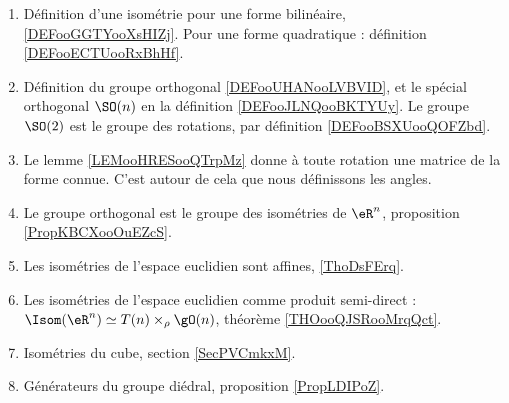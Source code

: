 
      \label{THMooVUCLooCrdbxm}
\begin{enumerate}
    \item 
        Définition d'une isométrie pour une forme bilinéaire, \ref{DEFooGGTYooXsHIZj}. Pour une forme quadratique : définition \ref{DEFooECTUooRxBhHf}.
    \item
        Définition du groupe orthogonal \ref{DEFooUHANooLVBVID}, et le spécial orthogonal \( \SO(n)\) en la définition \ref{DEFooJLNQooBKTYUy}. Le groupe \( \SO(2)\) est le groupe des rotations, par définition \ref{DEFooBSXUooQOFZbd}.
    \item
        Le lemme \ref{LEMooHRESooQTrpMz} donne à toute rotation une matrice de la forme connue. C'est autour de cela que nous définissons les angles.
    \item
        Le groupe orthogonal est le groupe des isométries de \( \eR^n\), proposition \ref{PropKBCXooOuEZcS}.
    \item
        Les isométries de l'espace euclidien sont affines, \ref{ThoDsFErq}.
    \item
        Les isométries de l'espace euclidien comme produit semi-direct : $\Isom(\eR^n)\simeq T(n)\times_{\rho}\gO(n)$, théorème \ref{THOooQJSRooMrqQct}.
    \item
        Isométries du cube, section \ref{SecPVCmkxM}.
    \item 
        Générateurs du groupe diédral, proposition \ref{PropLDIPoZ}.
\end{enumerate}

